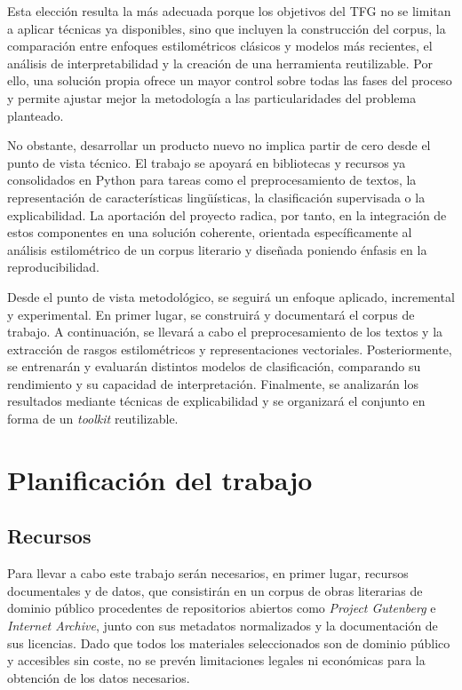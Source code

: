 \documentclass[IB]{TFUOC}%
\begin{document}
Esta elección resulta la más adecuada porque los objetivos del TFG no se limitan a aplicar técnicas ya disponibles, sino que incluyen la construcción del corpus, la comparación entre enfoques estilométricos clásicos y modelos más recientes, el análisis de interpretabilidad y la creación de una herramienta reutilizable. Por ello, una solución propia ofrece un mayor control sobre todas las fases del proceso y permite ajustar mejor la metodología a las particularidades del problema planteado.

No obstante, desarrollar un producto nuevo no implica partir de cero desde el punto de vista técnico. El trabajo se apoyará en bibliotecas y recursos ya consolidados en Python para tareas como el preprocesamiento de textos, la representación de características lingüísticas, la clasificación supervisada o la explicabilidad. La aportación del proyecto radica, por tanto, en la integración de estos componentes en una solución coherente, orientada específicamente al análisis estilométrico de un corpus literario y diseñada poniendo énfasis en la reproducibilidad.

Desde el punto de vista metodológico, se seguirá un enfoque aplicado, incremental y experimental. En primer lugar, se construirá y documentará el corpus de trabajo. A continuación, se llevará a cabo el preprocesamiento de los textos y la extracción de rasgos estilométricos y representaciones vectoriales. Posteriormente, se entrenarán y evaluarán distintos modelos de clasificación, comparando su rendimiento y su capacidad de interpretación. Finalmente, se analizarán los resultados mediante técnicas de explicabilidad y se organizará el conjunto en forma de un \textit{toolkit} reutilizable.

\section{Planificación del trabajo}

\subsection{Recursos}

Para llevar a cabo este trabajo serán necesarios, en primer lugar, recursos documentales y de datos, que consistirán en un corpus de obras literarias de dominio público procedentes de repositorios abiertos como \textit{Project Gutenberg} e \textit{Internet Archive}, junto con sus metadatos normalizados y la documentación de sus licencias. Dado que todos los materiales seleccionados son de dominio público y accesibles sin coste, no se prevén limitaciones legales ni económicas para la obtención de los datos necesarios.
\end{document}
